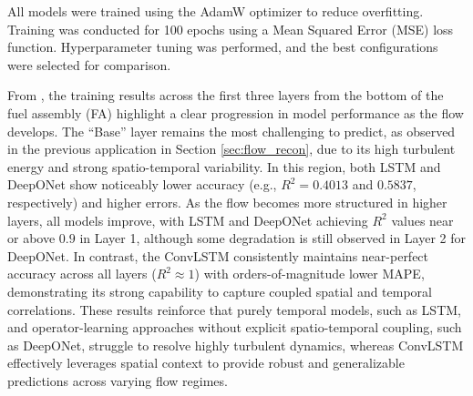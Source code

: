 \documentclass[review]{elsarticle}
\theoremstyle{definition}
\theoremstyle{definition}
\theoremstyle{remark}
\begin{document}
All models were trained using the AdamW optimizer to reduce overfitting. Training was conducted for 100 epochs using a Mean Squared Error (MSE) loss function. Hyperparameter tuning was performed, and the best configurations were selected for comparison.

From , the training results across the first three layers from the bottom of the fuel assembly (FA) highlight a clear progression in model performance as the flow develops. The ``Base'' layer remains the most challenging to predict, as observed in the previous application in Section \ref{sec:flow_recon}, due to its high turbulent energy and strong spatio-temporal variability. In this region, both LSTM and DeepONet show noticeably lower accuracy (e.g., $R^2 = 0.4013$ and $0.5837$, respectively) and higher errors. As the flow becomes more structured in higher layers, all models improve, with LSTM and DeepONet achieving $R^2$ values near or above $0.9$ in Layer 1, although some degradation is still observed in Layer 2 for DeepONet. In contrast, the ConvLSTM consistently maintains near-perfect accuracy across all layers ($R^2 \approx 1$) with orders-of-magnitude lower MAPE, demonstrating its strong capability to capture coupled spatial and temporal correlations. These results reinforce that purely temporal models, such as LSTM, and operator-learning approaches without explicit spatio-temporal coupling, such as DeepONet, struggle to resolve highly turbulent dynamics, whereas ConvLSTM effectively leverages spatial context to provide robust and generalizable predictions across varying flow regimes.

\begin{table}[h!]
	\centering
	\caption{Model performance comparison across the first three layers. The metrics are computed by comparing the predicted flow rates against the ground-truth high-fidelity simulation data over the final 2000 time steps of the test sequence. All metrics are evaluated on an unseen test set to assess the model's generalization performance.}
	\label{tab:ml_compNO}
	\renewcommand{\arraystretch}{1.2}
\end{table}
\end{document}
